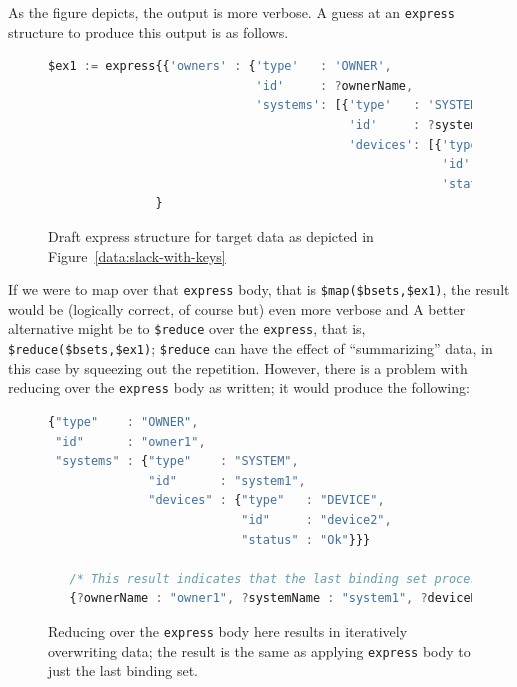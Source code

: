 \documentclass[10pt,letterpaper]{article} %
\newcommand{\stt}[1]{\texttt{#1}} %
\begin{document}
As the figure depicts, the output is more verbose. %
A guess at an \stt{express} structure to produce this output is as follows.
\begin{figure}[H]
  \caption{Draft express structure for target data as depicted in Figure~\ref{data:slack-with-keys}}
 \label{code:slack-possible-express}
\begin{lstlisting}[language=JavaScript,basicstyle=\ttfamily\scriptsize,numberstyle=\scriptsize]
$ex1 := express{{'owners' : {'type'   : 'OWNER',
                             'id'     : ?ownerName,
                             'systems': [{'type'   : 'SYSTEM',
                                          'id'     : ?systemName,
                                          'devices': [{'type'  : 'DEVICE',
                                                       'id'    : ?deviceName,
                                                       'status': ?status}]}]}}
               }
\end{lstlisting}
\end{figure}  \vspace{-2em}

If we were to map over that \stt{express} body, that is \stt{\$map(\$bsets,\$ex1)}, the result would be (logically correct, of course but) even more verbose and %
A better alternative might be to \stt{\$reduce} over the \stt{express}, that is, \stt{\$reduce(\$bsets,\$ex1)};
\stt{\$reduce} can have the effect of ``summarizing'' data, in this case by squeezing out the repetition.
However, there is a problem with reducing over the \stt{express} body as written;
it would produce the following:

\begin{figure}[H]
  \caption{Reducing over the \stt{express} body here results in iteratively overwriting data; the result is
    the same as applying \stt{express} body to just the last binding set.}
 \label{code:slack-result-wo-keys}
\begin{lstlisting}[language=JavaScript,basicstyle=\ttfamily\scriptsize,numberstyle=\scriptsize]
{"type"    : "OWNER",
 "id"      : "owner1",
 "systems" : {"type"    : "SYSTEM",
              "id"      : "system1",
              "devices" : {"type"   : "DEVICE",
                           "id"     : "device2",
                           "status" : "Ok"}}}

   /* This result indicates that the last binding set processed was the following */
   {?ownerName : "owner1", ?systemName : "system1", ?deviceName : "device2", ?status : "Ok", ?id : 200}
\end{lstlisting}
\end{figure}  \vspace{-2em}
\end{document}
